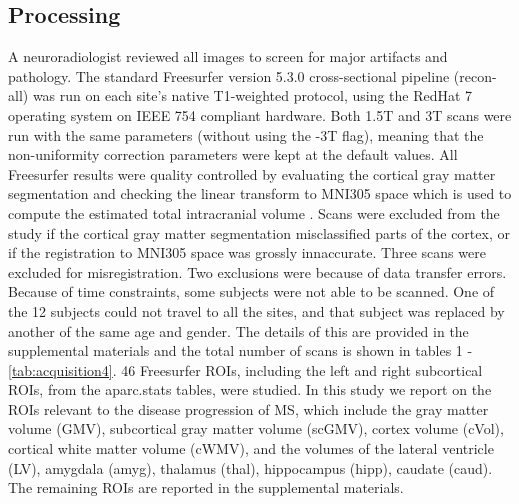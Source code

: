 \subsection{Processing}
 A neuroradiologist reviewed all images to screen for major artifacts and pathology. The standard Freesurfer \cite{freesurferPaper} version 5.3.0 cross-sectional pipeline (recon-all) was run on each site's native T1-weighted protocol, using the RedHat 7 operating system on IEEE 754 compliant hardware. Both 1.5T and 3T scans were run with the same parameters (without using the -3T flag), meaning that the non-uniformity correction parameters were kept at the default values. All Freesurfer results were quality controlled by evaluating the cortical gray matter segmentation and checking the  linear transform to MNI305 space which is used to compute the estimated total intracranial volume \cite{buckner2004unified}. Scans were excluded from the study if the cortical gray matter segmentation misclassified parts of the cortex, or if the registration to MNI305 space was grossly innaccurate. Three scans were excluded for misregistration. Two exclusions were because of data transfer errors. Because of time constraints, some subjects were not able to be scanned. One of the 12 subjects could not travel to all the sites, and that subject was replaced by another of the same age and gender. The details of this are provided in the supplemental materials and the total number of scans is shown in tables 1 - \ref{tab:acquisition4}. 46 Freesurfer ROIs, including the left and right subcortical ROIs, from the aparc.stats tables, were studied. In this study we report on the ROIs relevant to the disease progression of MS, which include the gray matter volume (GMV), subcortical gray matter volume (scGMV), cortex volume (cVol), cortical white matter volume (cWMV), and the volumes of the lateral ventricle (LV), amygdala (amyg), thalamus (thal), hippocampus (hipp), caudate (caud). The remaining ROIs are reported in the supplemental materials. 
